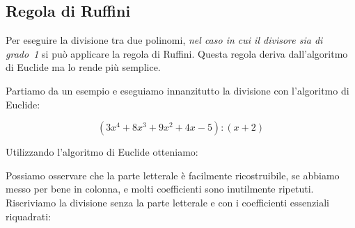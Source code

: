 \subsection{Regola di Ruffini}
\label{subsec:divpol_divisione_ruffini}

Per eseguire la divisione tra due polinomi, \emph{nel caso in cui il
divisore sia di grado~1} si può applicare la regola di Ruffini.
Questa regola deriva dall'algoritmo di Euclide ma lo rende più semplice.

% 

Partiamo da un esempio e eseguiamo innanzitutto la divisione con l'algoritmo 
di Euclide:


\[\left(3 x^4 +8 x^3 +9 x^2 +4 x -5\right) : (x + 2)\]

Utilizzando l'algoritmo di Euclide otteniamo:

\begin{inaccessibleblock}
\begin{center}
% 
\ruffinia
\end{center}
\end{inaccessibleblock}

Possiamo osservare che la parte letterale è facilmente ricostruibile, se 
abbiamo messo per bene in colonna, e molti coefficienti sono inutilmente 
ripetuti. Riscriviamo la divisione senza la parte letterale e con i
coefficienti essenziali riquadrati:

\begin{inaccessibleblock}
\begin{center}
%  
\ruffinib
\end{center}
\end{inaccessibleblock}

